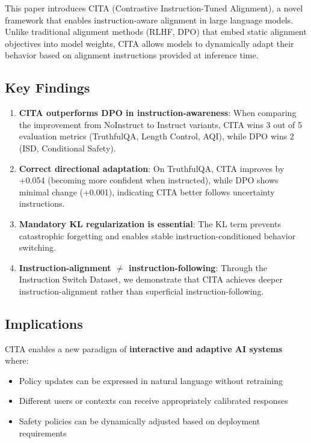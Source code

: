 
\label{sec:conclusion}

This paper introduces CITA (Contrastive Instruction-Tuned Alignment), a novel framework that enables instruction-aware alignment in large language models. Unlike traditional alignment methods (RLHF, DPO) that embed static alignment objectives into model weights, CITA allows models to dynamically adapt their behavior based on alignment instructions provided at inference time.

\subsection{Key Findings}

\begin{enumerate}
    \item \textbf{CITA outperforms DPO in instruction-awareness}: When comparing the improvement from NoInstruct to Instruct variants, CITA wins 3 out of 5 evaluation metrics (TruthfulQA, Length Control, AQI), while DPO wins 2 (ISD, Conditional Safety).

    \item \textbf{Correct directional adaptation}: On TruthfulQA, CITA improves by +0.054 (becoming more confident when instructed), while DPO shows minimal change (+0.001), indicating CITA better follows uncertainty instructions.

    \item \textbf{Mandatory KL regularization is essential}: The KL term prevents catastrophic forgetting and enables stable instruction-conditioned behavior switching.

    \item \textbf{Instruction-alignment $\neq$ instruction-following}: Through the Instruction Switch Dataset, we demonstrate that CITA achieves deeper instruction-alignment rather than superficial instruction-following.
\end{enumerate}

\subsection{Implications}

CITA enables a new paradigm of \textbf{interactive and adaptive AI systems} where:
\begin{itemize}
    \item Policy updates can be expressed in natural language without retraining
    \item Different users or contexts can receive appropriately calibrated responses
    \item Safety policies can be dynamically adjusted based on deployment requirements
\end{itemize}

